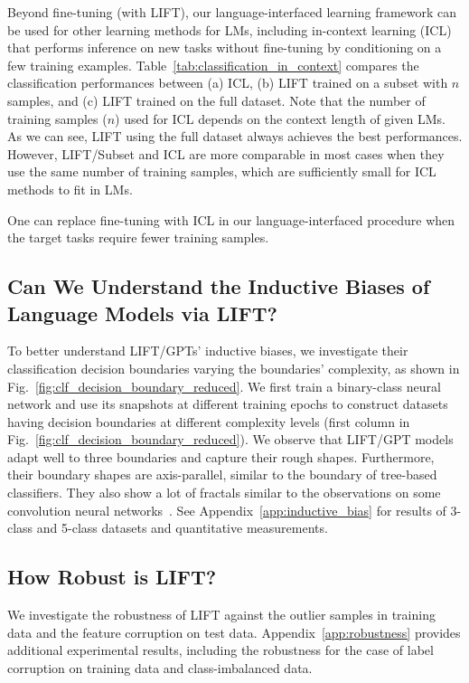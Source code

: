 Beyond fine-tuning (with \textsc{LIFT}), our language-interfaced learning framework can be used for other learning methods for LMs, including in-context learning (ICL)~\citep{reynolds2021prompt,shin2020autoprompt,brown2020gpt3} that performs inference on new tasks without fine-tuning by conditioning on a few training examples.
Table~\ref{tab:classification_in_context} compares the classification performances between (a) ICL, (b) \textsc{LIFT} trained on a subset with $n$ samples, and (c) \textsc{LIFT} trained on the full dataset. Note that the number of training samples ($n$) used for ICL depends on the context length of given LMs. As we can see, \textsc{LIFT} using the full dataset always achieves the best performances. However, \textsc{LIFT}/Subset and ICL are more comparable in most cases when they use the same number of training samples, which are sufficiently small for ICL methods to fit in LMs.

\begin{remark}
One can replace fine-tuning with ICL in our language-interfaced procedure when the target tasks require fewer training samples.
\end{remark}

\subsection{Can We Understand the Inductive Biases of Language Models via \textsc{LIFT}?}

\label{sec:inductive_bias}
To better understand \textsc{LIFT}/GPTs' inductive biases, we investigate their classification decision boundaries varying the boundaries' complexity, as shown in Fig.~\ref{fig:clf_decision_boundary_reduced}.
We first train a binary-class neural network and use its snapshots at different training epochs to construct datasets having decision boundaries at different complexity levels (first column in Fig.~\ref{fig:clf_decision_boundary_reduced}). 
We observe that \textsc{LIFT}/GPT models adapt well to three boundaries and capture their rough shapes. Furthermore, their boundary shapes are axis-parallel, similar to the boundary of tree-based classifiers. They also show a lot of fractals similar to the observations on some convolution neural networks~\citep{somepalli2022can}. See Appendix~\ref{app:inductive_bias} for results of 3-class and 5-class datasets and quantitative measurements.

\subsection{How Robust is \textsc{LIFT}?}\label{sec:robustness}
We investigate the robustness of \textsc{LIFT} against the outlier samples in training data and the feature corruption on test data.
Appendix~\ref{app:robustness} provides additional experimental results, including the robustness for the case of label corruption on training data and class-imbalanced data.

